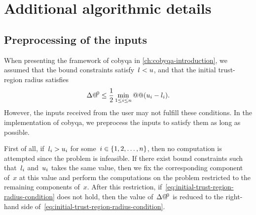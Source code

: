 \section{Additional algorithmic details}
\label{sec:implementation-details}

\subsection{Preprocessing of the inputs}

When presenting the framework of \gls{cobyqa} in \cref{ch:cobyqa-introduction}, we assumed that the bound constraints satisfy~$l < u$, and that the initial trust-region radius satisfies
\begin{equation}
    \label{eq:initial-trust-region-radius-condition}
    \rad[0] \le \frac{1}{2} \min_{1 \le i \le n} @@ (\xu_i - \xl_i).
\end{equation}
However, the inputs received from the user may not fulfill these conditions.
In the implementation of \gls{cobyqa}, we preprocess the inputs to satisfy them as long as possible.

First of all, if~$l_i > u_i$ for some~$i \in \{1, 2, \dots, n\}$, then no computation is attempted since the problem is infeasible.
If there exist bound constraints such that~$l_i$ and~$u_i$ takes the same value, then we fix the corresponding component of~$x$ at this value and perform the computations on the problem restricted to the remaining components of~$x$.
After this restriction, if~\cref{eq:initial-trust-region-radius-condition} does not hold, then the value of~$\rad[0]$ is reduced to the right-hand side of~\cref{eq:initial-trust-region-radius-condition}.


